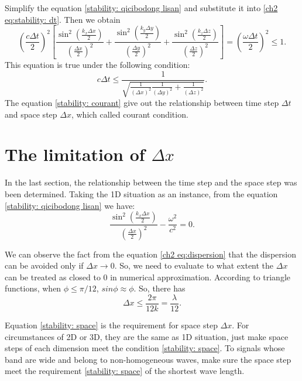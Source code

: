 Simplify the equation \eqref{stability: qicibodong lisan} and substitute it into \eqref{ch2 eq:stability: dt}. Then we obtain
\begin{equation}
\left(\frac{c\Delta t}{2}\right)^2
\left[
\frac{\sin^2 \left( \frac{k_x\Delta x}{2} \right)}{\left(\frac{\Delta x}{2}\right)^2}+
\frac{\sin^2 \left( \frac{k_y\Delta y}{2} \right)}{\left(\frac{\Delta y}{2}\right)^2}+
\frac{\sin^2 \left( \frac{k_z\Delta z}{2} \right)}{\left(\frac{\Delta z}{2}\right)^2}
\right]=
\left(\frac{\omega\Delta t}{2}\right)^2\leqslant 1.
\end{equation}
This equation is true under the following condition:
\begin{equation}\label{stability: courant}
c\Delta t\leqslant
\frac{1}{
	\sqrt{\frac{1}{(\Delta x)^2}\frac{1}{(\Delta y)^2}+\frac{1}{(\Delta z)^2}}
	}.
\end{equation}
The equation \eqref{stability: courant} give out the relationship between time step $\Delta t$ and space step $\Delta x$, which called courant condition.

\section{The limitation of $\Delta x$}
In the last section, the relationship between the time step and the space step was been determined. Taking the 1D situation as an instance, from the equation \eqref{stability: qicibodong lisan} we have:
\begin{equation}
\frac{\sin^2 \left( \frac{k_x\Delta x}{2} \right)}{\left(\frac{\Delta x}{2}\right)^2}-
\frac{\omega^2}{c^2}=0.
\end{equation}\label{ch2 eq:dispersion}

We can observe the fact from the equation \eqref{ch2 eq:dispersion} that the dispersion can be avoided only if $\Delta x\rightarrow 0$. So, we need to evaluate to what extent the $\Delta x$ can be treated as closed to 0 in numerical approximation. According to triangle functions, when $\phi\leqslant \pi/12$, $sin\phi\approx\phi$. So, there has
\begin{equation}\label{stability: space}
	\Delta x\leqslant \frac{2\pi}{12k}=\frac{\lambda}{12}.
\end{equation}

Equation \eqref{stability: space} is the requirement for space step $\Delta x$. For circumstances of 2D or 3D, they are the same as 1D situation, just make space steps of each dimension meet the condition \eqref{stability: space}. To signals whose band are wide and belong to non-homogeneous waves, make sure the space step meet the requirement \eqref{stability: space} of the shortest wave length.


